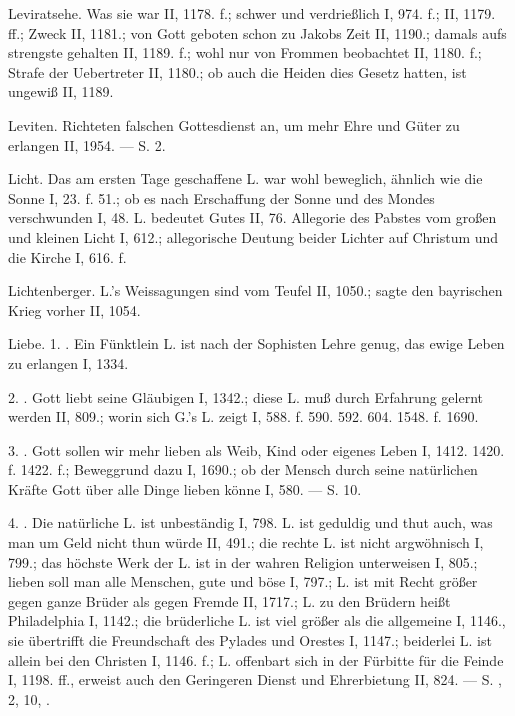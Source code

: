 Leviratsehe. Was sie war II, 1178. f.; schwer und verdrießlich I, 974. f.; II, 1179. ff.; Zweck II, 1181.; von Gott geboten schon zu Jakobs Zeit II, 1190.; damals aufs strengste gehalten II, 1189. f.; wohl nur von Frommen beobachtet II, 1180. f.; Strafe der Uebertreter II, 1180.; ob auch die Heiden dies Gesetz hatten, ist ungewiß II, 1189.

Leviten. Richteten falschen Gottesdienst an, um mehr Ehre und Güter zu erlangen II, 1954. — S.  2.

Licht. Das am ersten Tage geschaffene L. war wohl beweglich, ähnlich wie die Sonne I, 23. f. 51.; ob es nach Erschaffung der Sonne und des Mondes verschwunden I, 48. L. bedeutet Gutes II, 76. Allegorie des Pabstes vom großen und kleinen Licht I, 612.; allegorische Deutung beider Lichter auf Christum und die Kirche I, 616. f.

Lichtenberger. L.’s Weissagungen sind vom Teufel II, 1050.; sagte den bayrischen Krieg vorher II, 1054.

Liebe. 1. . Ein Fünktlein L. ist nach der Sophisten Lehre genug, das ewige Leben zu erlangen I, 1334.

2. . Gott liebt seine Gläubigen I, 1342.; diese L. muß durch Erfahrung gelernt werden II, 809.; worin sich G.’s L. zeigt I, 588. f. 590. 592. 604. 1548. f. 1690.

3. . Gott sollen wir mehr lieben als Weib, Kind oder eigenes Leben I, 1412. 1420. f. 1422. f.; Beweggrund dazu I, 1690.; ob der Mensch durch seine natürlichen Kräfte Gott über alle Dinge lieben könne I, 580. — S.  10.

4. . Die natürliche L. ist unbeständig I, 798. L. ist geduldig und thut auch, was man um Geld nicht thun würde II, 491.; die rechte L. ist nicht argwöhnisch I, 799.; das höchste Werk der L. ist in der wahren Religion unterweisen I, 805.; lieben soll man alle Menschen, gute und böse I, 797.; L. ist mit Recht größer gegen ganze Brüder als gegen Fremde II, 1717.; L. zu den Brüdern heißt Philadelphia I, 1142.; die brüderliche L. ist viel größer als die allgemeine I, 1146., sie übertrifft die Freundschaft des Pylades und Orestes I, 1147.; beiderlei L. ist allein bei den Christen I, 1146. f.; L. offenbart sich in der Fürbitte für die Feinde I, 1198. ff., erweist auch den Geringeren Dienst und Ehrerbietung II, 824. — S. ,  2,  10, .

